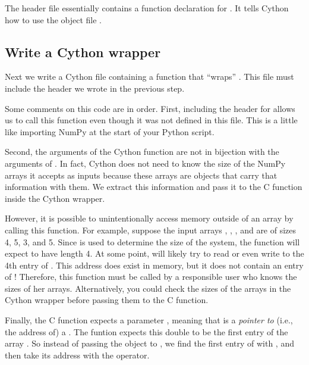 The header file essentially contains a function declaration for .
It tells Cython how to use the object file .


\subsection*{Write a Cython wrapper}
Next we write a Cython file containing a function that ``wraps'' .
This file must include the header we wrote in the previous step.



Some comments on this code are in order. 
First, including the header for  allows us to call this function even though it was not defined in this file.
This is a little like importing NumPy at the start of your Python script.

Second, the arguments of the Cython function  are not in bijection with the arguments of .
In fact, Cython does not need to know the size of the NumPy arrays it accepts as inputs because these arrays are objects that carry that information with them.
We extract this information and pass it to the C function inside the Cython wrapper.

However, it is possible to unintentionally access memory outside of an array by calling this function.
For example, suppose the input arrays , , , and  are of sizes 4, 5, 3, and 5.
Since  is used to determine the size of the system, the function  will expect  to have length 4.
At some point,  will likely try to read or even write to the 4th entry of .
This address does exist in memory, but it does not contain an entry of !
Therefore, this function must be called by a responsible user who knows the sizes of her arrays.
Alternatively, you could check the sizes of the arrays in the Cython wrapper before passing them to the C function.

Finally, the C function expects a parameter , meaning that  is a \emph{pointer to} (i.e., the address of) a .
The funtion  expects this double to be the first entry of the array .
So instead of passing the object  to , we find the first entry of  with , and then take its address with the \li{&} operator.





